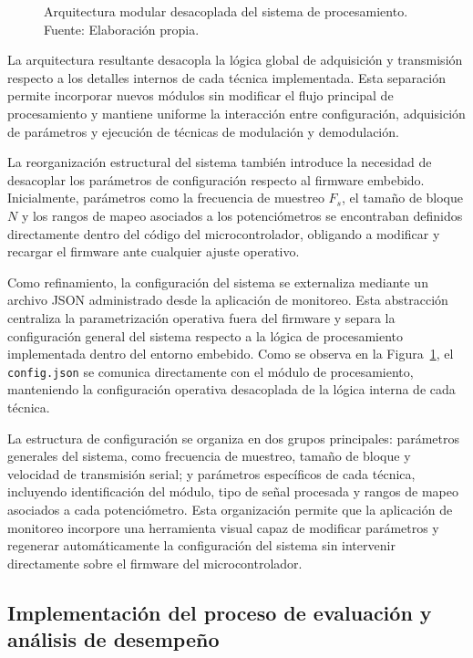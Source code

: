 \begin{figure}[H]
    \centering
    \resizebox{0.82\textwidth}{!}{
        
    }
    \caption{Arquitectura modular desacoplada del sistema de procesamiento. Fuente: Elaboración propia.}
    \label{fig:modular_architecture}
\end{figure}

La arquitectura resultante desacopla la lógica global de adquisición y transmisión respecto a los detalles internos de cada técnica implementada. Esta separación permite incorporar nuevos módulos sin modificar el flujo principal de procesamiento y mantiene uniforme la interacción entre configuración, adquisición de parámetros y ejecución de técnicas de modulación y demodulación.

La reorganización estructural del sistema también introduce la necesidad de desacoplar los parámetros de configuración respecto al firmware embebido. Inicialmente, parámetros como la frecuencia de muestreo $F_s$, el tamaño de bloque $N$ y los rangos de mapeo asociados a los potenciómetros se encontraban definidos directamente dentro del código del microcontrolador, obligando a modificar y recargar el firmware ante cualquier ajuste operativo.

Como refinamiento, la configuración del sistema se externaliza mediante un archivo JSON administrado desde la aplicación de monitoreo. Esta abstracción centraliza la parametrización operativa fuera del firmware y separa la configuración general del sistema respecto a la lógica de procesamiento implementada dentro del entorno embebido. Como se observa en la Figura~\ref{fig:modular_architecture}, el \texttt{config.json} se comunica directamente con el módulo de procesamiento, manteniendo la configuración operativa desacoplada de la lógica interna de cada técnica.

La estructura de configuración se organiza en dos grupos principales: parámetros generales del sistema, como frecuencia de muestreo, tamaño de bloque y velocidad de transmisión serial; y parámetros específicos de cada técnica, incluyendo identificación del módulo, tipo de señal procesada y rangos de mapeo asociados a cada potenciómetro. Esta organización permite que la aplicación de monitoreo incorpore una herramienta visual capaz de modificar parámetros y regenerar automáticamente la configuración del sistema sin intervenir directamente sobre el firmware del microcontrolador.




\subsection{Implementación del proceso de evaluación y análisis de desempeño}


